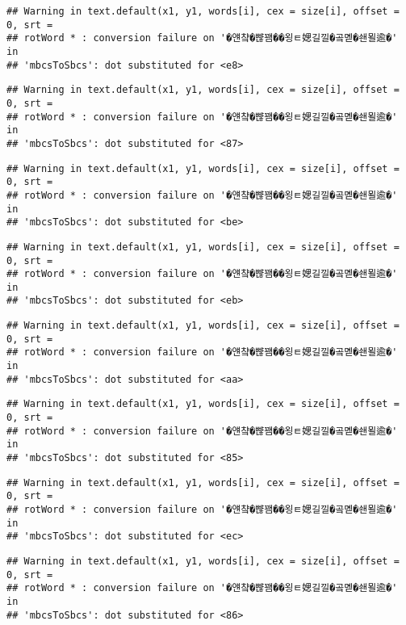 \documentclass[]{article}
\begin{document}
\begin{verbatim}
## Warning in text.default(x1, y1, words[i], cex = size[i], offset = 0, srt =
## rotWord * : conversion failure on '�얜챸�뺞꽴��욍ㅌ媤길낄�곸몓�쇈묄逾�' in
## 'mbcsToSbcs': dot substituted for <e8>
\end{verbatim}

\begin{verbatim}
## Warning in text.default(x1, y1, words[i], cex = size[i], offset = 0, srt =
## rotWord * : conversion failure on '�얜챸�뺞꽴��욍ㅌ媤길낄�곸몓�쇈묄逾�' in
## 'mbcsToSbcs': dot substituted for <87>
\end{verbatim}

\begin{verbatim}
## Warning in text.default(x1, y1, words[i], cex = size[i], offset = 0, srt =
## rotWord * : conversion failure on '�얜챸�뺞꽴��욍ㅌ媤길낄�곸몓�쇈묄逾�' in
## 'mbcsToSbcs': dot substituted for <be>
\end{verbatim}

\begin{verbatim}
## Warning in text.default(x1, y1, words[i], cex = size[i], offset = 0, srt =
## rotWord * : conversion failure on '�얜챸�뺞꽴��욍ㅌ媤길낄�곸몓�쇈묄逾�' in
## 'mbcsToSbcs': dot substituted for <eb>
\end{verbatim}

\begin{verbatim}
## Warning in text.default(x1, y1, words[i], cex = size[i], offset = 0, srt =
## rotWord * : conversion failure on '�얜챸�뺞꽴��욍ㅌ媤길낄�곸몓�쇈묄逾�' in
## 'mbcsToSbcs': dot substituted for <aa>
\end{verbatim}

\begin{verbatim}
## Warning in text.default(x1, y1, words[i], cex = size[i], offset = 0, srt =
## rotWord * : conversion failure on '�얜챸�뺞꽴��욍ㅌ媤길낄�곸몓�쇈묄逾�' in
## 'mbcsToSbcs': dot substituted for <85>
\end{verbatim}

\begin{verbatim}
## Warning in text.default(x1, y1, words[i], cex = size[i], offset = 0, srt =
## rotWord * : conversion failure on '�얜챸�뺞꽴��욍ㅌ媤길낄�곸몓�쇈묄逾�' in
## 'mbcsToSbcs': dot substituted for <ec>
\end{verbatim}

\begin{verbatim}
## Warning in text.default(x1, y1, words[i], cex = size[i], offset = 0, srt =
## rotWord * : conversion failure on '�얜챸�뺞꽴��욍ㅌ媤길낄�곸몓�쇈묄逾�' in
## 'mbcsToSbcs': dot substituted for <86>
\end{verbatim}
\end{document}
